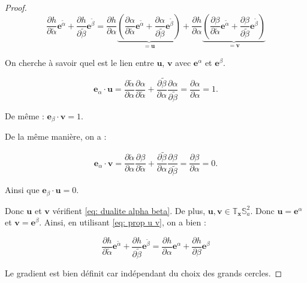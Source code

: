 \begin{proof}
\begin{equation}
\dfrac{\partial h}{\partial \tilde{\alpha}} \mathbf{e}^{\tilde{\alpha}} + \dfrac{\partial h}{\partial \tilde{\beta}} \mathbf{e}^{\tilde{\beta}} = \dfrac{\partial h}{\partial \alpha}  \underbrace{\left( \dfrac{\partial \alpha}{\partial \tilde{\alpha}} \mathbf{e}^{\tilde{\alpha}} + \dfrac{\partial \alpha}{\partial \tilde{\beta}} \mathbf{e}^{\tilde{\beta}}  \right)} _{=\mathbf{u}} + \dfrac{\partial h}{\partial \alpha}  \underbrace{\left( \dfrac{\partial \beta}{\partial \tilde{\alpha}} \mathbf{e}^{\tilde{\alpha}} + \dfrac{\partial \beta}{\partial \tilde{\beta}} \mathbf{e}^{\tilde{\beta}} \right)}_{= \mathbf{v}} 
\label{eq: prop u v}
\end{equation}

On cherche à savoir quel est le lien entre $\mathbf{u}$, $\mathbf{v}$ avec $\mathbf{e}^{\alpha}$ et $\mathbf{e}^{\beta}$.

\begin{equation}
\mathbf{e}_{\alpha} \cdot \mathbf{u} = \dfrac{\partial \tilde{\alpha}}{\partial \alpha} \dfrac{\partial \alpha}{\partial \tilde{\alpha}} + \dfrac{\partial \tilde{\beta}}{\partial \alpha} \dfrac{\partial \alpha}{\partial \tilde{\beta}} = \dfrac{\partial \alpha}{\partial \alpha} = 1.
\end{equation}

De même : $\mathbf{e}_{\beta} \cdot \mathbf{v} = 1$.

De la même manière, on a :

\begin{equation}
\mathbf{e}_{\alpha} \cdot \mathbf{v} = \dfrac{\partial \tilde{\alpha}}{\partial \alpha} \dfrac{\partial \beta}{\partial \tilde{\alpha}} + \dfrac{\partial \tilde{\beta}}{\partial \alpha} \dfrac{\partial \beta}{\partial \tilde{\beta}} = \dfrac{\partial \beta}{\partial \alpha} = 0.
\end{equation}

Ainsi que $\mathbf{e}_{\beta} \cdot \mathbf{u} = 0$.

Donc $\mathbf{u}$ et $\mathbf{v}$ vérifient \eqref{eq: dualite alpha beta}. De plus, $\mathbf{u}, \mathbf{v} \in \mathbb{T}_{\mathbf{x}} \mathbb{S}_a^2$. Donc $\mathbf{u} = \mathbf{e}^{\alpha}$ et $\mathbf{v} = \mathbf{e}^{\beta}$. Ainsi, en utilisant \eqref{eq: prop u v}, on a bien :

\begin{equation}
\dfrac{\partial h}{\partial \tilde{\alpha}} \mathbf{e}^{\tilde{\alpha}} + \dfrac{\partial h}{\partial \tilde{\beta}} \mathbf{e}^{\tilde{\beta}} = \dfrac{\partial h}{\partial \alpha} \mathbf{e}^{\alpha} + \dfrac{\partial h}{\partial \beta} \mathbf{e}^{\beta}
\end{equation}

Le gradient est bien définit car indépendant du choix des grands cercles.
\end{proof}

